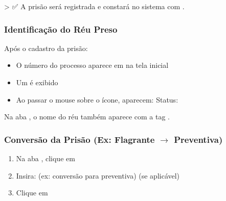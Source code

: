 \documentclass[letterpaper,10pt,brazil]{sphinxmanual}
\begin{document}
\sphinxAtStartPar
\textgreater{} ✅ A prisão será registrada e constará no sistema com .


\subsubsection{Identificação do Réu Preso}
\label{\detokenize{projud_25_cadastro reupreso:identificacao-do-reu-preso}}
\sphinxAtStartPar
Após o cadastro da prisão:
\begin{itemize}
\item {} 
\sphinxAtStartPar
O número do processo aparece em  na tela inicial

\item {} 
\sphinxAtStartPar
Um  é exibido

\item {} 
\sphinxAtStartPar
Ao passar o mouse sobre o ícone, aparecem:
\sphinxhyphen{} Status: 
\sphinxhyphen{} 

\end{itemize}

\sphinxAtStartPar
Na aba , o nome do réu também aparece com a tag .


\subsubsection{Conversão da Prisão (Ex: Flagrante \(\rightarrow\) Preventiva)}
\label{\detokenize{projud_25_cadastro reupreso:conversao-da-prisao-ex-flagrante-preventiva}}\begin{enumerate}
%
\item {} 
\sphinxAtStartPar
Na aba , clique em 

\item {} 
\sphinxAtStartPar
Insira:
\sphinxhyphen{}  (ex: conversão para preventiva)
\sphinxhyphen{} 
\sphinxhyphen{} 
\sphinxhyphen{} 
\sphinxhyphen{}  (se aplicável)

\item {} 
\sphinxAtStartPar
Clique em 

\end{enumerate}
\end{document}
